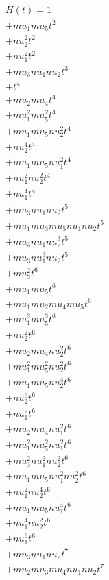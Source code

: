 \begin{align*}
H(t) = {}1 \\
  + mu_1 mu_5 t^{2} \\
  + nu_2^{2} t^{2} \\
  + nu_1^{2} t^{2} \\
  + mu_3 nu_1 nu_2 t^{3} \\
  + t^{4} \\
  + mu_2 mu_4 t^{4} \\
  + mu_1^{2} mu_5^{2} t^{4} \\
  + mu_1 mu_5 nu_2^{2} t^{4} \\
  + nu_2^{4} t^{4} \\
  + mu_1 mu_5 nu_1^{2} t^{4} \\
  + nu_1^{2} nu_2^{2} t^{4} \\
  + nu_1^{4} t^{4} \\
  + mu_3 nu_1 nu_2 t^{5} \\
  + mu_1 mu_3 mu_5 nu_1 nu_2 t^{5} \\
  + mu_3 nu_1 nu_2^{3} t^{5} \\
  + mu_3 nu_1^{3} nu_2 t^{5} \\
  + mu_3^{2} t^{6} \\
  + mu_1 mu_5 t^{6} \\
  + mu_1 mu_2 mu_4 mu_5 t^{6} \\
  + mu_1^{3} mu_5^{3} t^{6} \\
  + nu_2^{2} t^{6} \\
  + mu_2 mu_4 nu_2^{2} t^{6} \\
  + mu_1^{2} mu_5^{2} nu_2^{2} t^{6} \\
  + mu_1 mu_5 nu_2^{4} t^{6} \\
  + nu_2^{6} t^{6} \\
  + nu_1^{2} t^{6} \\
  + mu_2 mu_4 nu_1^{2} t^{6} \\
  + mu_1^{2} mu_5^{2} nu_1^{2} t^{6} \\
  + mu_3^{2} nu_1^{2} nu_2^{2} t^{6} \\
  + mu_1 mu_5 nu_1^{2} nu_2^{2} t^{6} \\
  + nu_1^{2} nu_2^{4} t^{6} \\
  + mu_1 mu_5 nu_1^{4} t^{6} \\
  + nu_1^{4} nu_2^{2} t^{6} \\
  + nu_1^{6} t^{6} \\
  + mu_3 nu_1 nu_2 t^{7} \\
  + mu_2 mu_3 mu_4 nu_1 nu_2 t^{7} \\

\end{align*}
